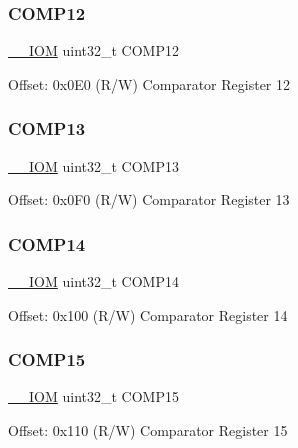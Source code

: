\subsubsection{\texorpdfstring{C\+O\+M\+P12}{COMP12}}
{\footnotesize\ttfamily \mbox{\hyperlink{core__cm4_8h_ab6caba5853a60a17e8e04499b52bf691}{\+\_\+\+\_\+\+I\+OM}} uint32\+\_\+t C\+O\+M\+P12}

Offset\+: 0x0\+E0 (R/W) Comparator Register 12 \mbox{\label{struct_d_w_t___type_a8e7c69cbac19ef0b26b0ae0cc928da36}} 
\subsubsection{\texorpdfstring{C\+O\+M\+P13}{COMP13}}
{\footnotesize\ttfamily \mbox{\hyperlink{core__cm4_8h_ab6caba5853a60a17e8e04499b52bf691}{\+\_\+\+\_\+\+I\+OM}} uint32\+\_\+t C\+O\+M\+P13}

Offset\+: 0x0\+F0 (R/W) Comparator Register 13 \mbox{\label{struct_d_w_t___type_af5930659b3107c17fa71e61803d63f97}} 
\subsubsection{\texorpdfstring{C\+O\+M\+P14}{COMP14}}
{\footnotesize\ttfamily \mbox{\hyperlink{core__cm4_8h_ab6caba5853a60a17e8e04499b52bf691}{\+\_\+\+\_\+\+I\+OM}} uint32\+\_\+t C\+O\+M\+P14}

Offset\+: 0x100 (R/W) Comparator Register 14 \mbox{\label{struct_d_w_t___type_ae55e0087f992cfd56003fc3fe1394cb0}} 
\subsubsection{\texorpdfstring{C\+O\+M\+P15}{COMP15}}
{\footnotesize\ttfamily \mbox{\hyperlink{core__cm4_8h_ab6caba5853a60a17e8e04499b52bf691}{\+\_\+\+\_\+\+I\+OM}} uint32\+\_\+t C\+O\+M\+P15}

Offset\+: 0x110 (R/W) Comparator Register 15 \mbox{\label{struct_d_w_t___type_aeeb1e36001c60a167399683280d6ec39}} 
